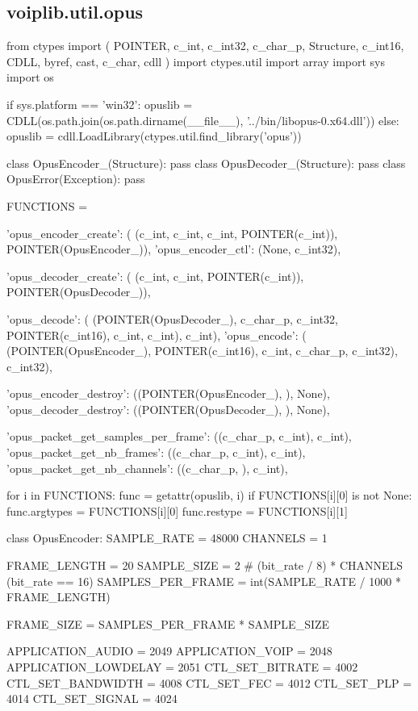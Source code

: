 \subsection{voiplib.util.opus}
\begin{pythoncode}
from ctypes import (
    POINTER, c_int, c_int32, c_char_p, Structure, c_int16, CDLL, byref, cast, c_char, cdll
)
import ctypes.util
import array
import sys
import os


if sys.platform == 'win32':
    opuslib = CDLL(os.path.join(os.path.dirname(__file__), '../bin/libopus-0.x64.dll'))
else:
    opuslib = cdll.LoadLibrary(ctypes.util.find_library('opus'))


class OpusEncoder_(Structure): pass
class OpusDecoder_(Structure): pass
class OpusError(Exception): pass


FUNCTIONS = {
    'opus_encoder_create': (
        (c_int, c_int, c_int, POINTER(c_int)),
        POINTER(OpusEncoder_)),
    'opus_encoder_ctl': (None, c_int32),

    'opus_decoder_create': (
        (c_int, c_int, POINTER(c_int)),
        POINTER(OpusDecoder_)),

    'opus_decode': (
        (POINTER(OpusDecoder_), c_char_p, c_int32, POINTER(c_int16), c_int, c_int),
        c_int),
    'opus_encode': (
        (POINTER(OpusEncoder_), POINTER(c_int16), c_int, c_char_p, c_int32),
        c_int32),

    'opus_encoder_destroy': ((POINTER(OpusEncoder_), ), None),
    'opus_decoder_destroy': ((POINTER(OpusDecoder_), ), None),

    'opus_packet_get_samples_per_frame': ((c_char_p, c_int), c_int),
    'opus_packet_get_nb_frames': ((c_char_p, c_int), c_int),
    'opus_packet_get_nb_channels': ((c_char_p, ), c_int),
}
for i in FUNCTIONS:
    func = getattr(opuslib, i)
    if FUNCTIONS[i][0] is not None:
        func.argtypes = FUNCTIONS[i][0]
    func.restype = FUNCTIONS[i][1]


class OpusEncoder:
    SAMPLE_RATE = 48000
    CHANNELS = 1

    FRAME_LENGTH = 20
    SAMPLE_SIZE = 2 # (bit\_rate / 8) * CHANNELS (bit\_rate == 16)
    SAMPLES_PER_FRAME = int(SAMPLE_RATE / 1000 * FRAME_LENGTH)

    FRAME_SIZE = SAMPLES_PER_FRAME * SAMPLE_SIZE

    APPLICATION_AUDIO    = 2049
    APPLICATION_VOIP     = 2048
    APPLICATION_LOWDELAY = 2051
    CTL_SET_BITRATE      = 4002
    CTL_SET_BANDWIDTH    = 4008
    CTL_SET_FEC          = 4012
    CTL_SET_PLP          = 4014
    CTL_SET_SIGNAL       = 4024


\end{pythoncode}
